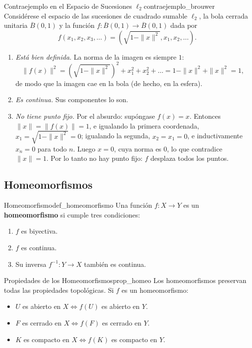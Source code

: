 \documentclass[11pt, a4paper]{article}
\begin{document}
\begin{ejemplo}{Contraejemplo en el Espacio de Sucesiones $\ell_2$}{contraejemplo_brouwer}
Considérese el espacio de las sucesiones de cuadrado sumable $\ell_2$, la bola cerrada unitaria
$\overline{B}(0, 1)$ y la función $f: \overline{B}(0, 1) \to \overline{B}(0, 1)$ dada por
$$ f(x_1, x_2, x_3, \dots) = \left( \sqrt{1 - \|x\|^2}, x_1, x_2, \dots \right). $$
\begin{enumerate}
    \item \textit{Está bien definida.} La norma de la imagen es siempre $1$:
    $$ \|f(x)\|^2 = (\sqrt{1 - \|x\|^2})^2 + x_1^2 + x_2^2 + \dots = 1 - \|x\|^2 + \|x\|^2 = 1, $$
    de modo que la imagen cae en la bola (de hecho, en la esfera).
    \item \textit{Es continua.} Sus componentes lo son.
    \item \textit{No tiene punto fijo.} Por el absurdo: supóngase $f(x) = x$. Entonces
    $\|x\| = \|f(x)\| = 1$, e
    igualando la primera coordenada, $x_1 = \sqrt{1 - \|x\|^2} = 0$; igualando la segunda,
    $x_2 = x_1 = 0$, e inductivamente $x_n = 0$ para todo $n$. Luego $x = 0$, cuya norma es $0$, lo
    que contradice $\|x\| = 1$. Por lo tanto no hay punto fijo: $f$ desplaza todos los puntos.
\end{enumerate}
\end{ejemplo}

\subsection{Homeomorfismos}

\begin{definicion}{Homeomorfismo}{def_homeomorfismo}
Una función $f: X \to Y$ es un \textbf{homeomorfismo} si cumple tres condiciones:
\begin{enumerate}
    \item $f$ es biyectiva.
    \item $f$ es continua.
    \item Su inversa $f^{-1}: Y \to X$ también es continua.
\end{enumerate}
\end{definicion}

\begin{proposicion}{Propiedades de los Homeomorfismos}{prop_homeo}
Los homeomorfismos preservan todas las propiedades topológicas. Si $f$ es un homeomorfismo:
\begin{itemize}
    \item $U$ es abierto en $X \iff f(U)$ es abierto en $Y$.
    \item $F$ es cerrado en $X \iff f(F)$ es cerrado en $Y$.
    \item $K$ es compacto en $X \iff f(K)$ es compacto en $Y$.
\end{itemize}
\end{proposicion}
\end{document}
